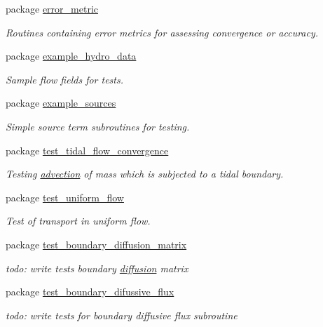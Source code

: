 \begin{CompactItemize}
\item 
package \hyperlink{a00060}{error\_\-metric}
\begin{CompactList}\small\item\em Routines containing error metrics for assessing convergence or accuracy. \item\end{CompactList}

\item 
package \hyperlink{a00061}{example\_\-hydro\_\-data}
\begin{CompactList}\small\item\em Sample flow fields for tests. \item\end{CompactList}

\item 
package \hyperlink{a00063}{example\_\-sources}
\begin{CompactList}\small\item\em Simple source term subroutines for testing. \item\end{CompactList}

\item 
package \hyperlink{a00096}{test\_\-tidal\_\-flow\_\-convergence}
\begin{CompactList}\small\item\em Testing \hyperlink{a00054}{advection} of mass which is subjected to a tidal boundary. \item\end{CompactList}

\item 
package \hyperlink{a00098}{test\_\-uniform\_\-flow}
\begin{CompactList}\small\item\em Test of transport in uniform flow. \item\end{CompactList}

\item 
package \hyperlink{a00078}{test\_\-boundary\_\-diffusion\_\-matrix}
\begin{CompactList}\small\item\em todo: write tests boundary \hyperlink{a00058}{diffusion} matrix \item\end{CompactList}

\item 
package \hyperlink{a00079}{test\_\-boundary\_\-difussive\_\-flux}
\begin{CompactList}\small\item\em todo: write tests for boundary diffusive flux subroutine \item\end{CompactList}


\end{CompactItemize}
